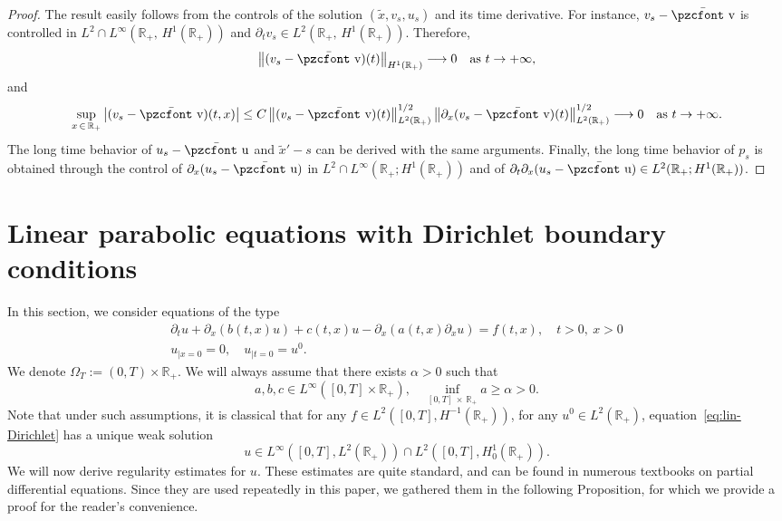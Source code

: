 \documentclass[10pt]{amsart}
\theoremstyle{definition}\newtheorem{defi}[theo]{Definition}\newtheorem{rema}[theo]{Remark}\newtheorem{exam}[theo]{Example}\newtheorem{exem}[theo]{Example}\newtheorem{nota}[theo]{Notation}
\newcommand{\mathpzc}[1]{\text{\pzcfont #1}}
\newcommand{\R}{\mathbb{R}}
\newcommand{\p}{\partial}
\newcommand{\bv}{\bar{\mathpzc{v}}}
\newcommand{\bu}{\bar{\mathpzc{u}}}
\newcommand{\tx}{\widetilde{x}}
\begin{document}
\begin{proof}
The result easily follows from the controls of the solution $(\tx,v_s,u_s)$ and its time derivative. For instance, $v_s -\bv$ is controlled in $L^2 \cap L^\infty(\R_+,\, H^1(\R_+))$ and $\partial_t v_s \in L^2(\R_+,\, H^1(\R_+))$. Therefore,
\[
\left\|(v_s -\bv)(t)\right\|_{H^1(\R_+)} \longrightarrow 0 \quad \text{as}~t\to +\infty,
\]
and
\[
\sup_{x\,\in\,\R_+}\big| (v_s -\bv)(t,x) \big| \leq C \left\|(v_s -\bv)(t) \right\|_{L^2(\R_+)}^{1/2} \left\|\partial_x (v_s -\bv)(t) \right\|_{L^2(\R_+)}^{1/2} \longrightarrow 0 \quad \text{as}~t\to +\infty.
\]
The long time behavior of $u_s-\bu$ and $\tx' -s$ can be derived with the same arguments. Finally, the long time behavior of $p_s$ is obtained through the control of $\partial_x(u_s -\bu)$ in $L^2 \cap L^\infty(\R_+; H^1(\R_+))$ and of $\partial_t \partial_x(u_s -\bu) \in L^2(\R_+; H^1(\R_+))$.
\end{proof}



\appendix

\section{Linear parabolic equations with Dirichlet boundary conditions}

In this section, we consider equations of the type
\begin{equation}\label{eq:lin-Dirichlet}
\begin{aligned}
\p_t u +\p_x(b(t,x) u)+ c(t,x) u -\p_{x}(a(t,x) \p_x u)=f(t,x),\quad t>0, \ x>0\\
u_{|x=0}=0,\quad u_{|t=0}=u^0.
\end{aligned}
\end{equation} We denote $\Omega_T:=(0,T)\times \R_+$. We will always assume that there exists $\alpha>0$ such that
\begin{equation}\label{hyp:minimales-coeffs}
a,b,c\in L^\infty([0,T]\times \R_+),\quad \inf_{[0,T]\,\times\,\R_+} a\geq \alpha>0.
\end{equation}
Note that under such assumptions, it is classical that for any $f\in L^2([0,T], H^{-1}(\R_+))$, for any $u^0\in L^2(\R_+)$, equation~\eqref{eq:lin-Dirichlet} has a unique weak solution
\[
u\in L^\infty\left([0,T], L^2(\R_+)\right)\cap L^2\left([0,T], H^1_0(\R_+)\right).
\]
We will now derive regularity estimates for $u$. These estimates are quite standard, and can be found in numerous textbooks on partial differential equations. Since they are used repeatedly in this paper, we gathered them in the following Proposition, for which we provide a proof for the reader's convenience.
\end{document}
